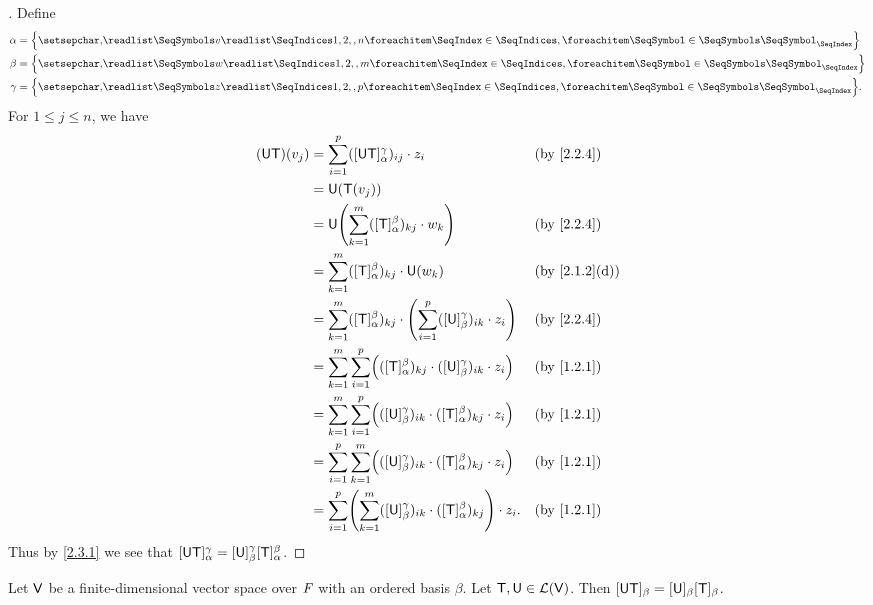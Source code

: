 \begin{proof}[]
  Define
  \begin{align*}
    \alpha & = \set{\seq{v}{1,2,,n}}  \\
    \beta  & = \set{\seq{w}{1,2,,m}}  \\
    \gamma & = \set{\seq{z}{1,2,,p}}.
  \end{align*}
  For \(1 \leq j \leq n\), we have
  \begin{align*}
    (\U \T)(v_j) & = \sum_{i = 1}^p ([\U \T]_{\alpha}^{\gamma})_{i j} \cdot z_i                                                      &  & \text{(by \cref{2.2.4})}    \\
                 & = \U(\T(v_j))                                                                                                                                      \\
                 & = \U\pa{\sum_{k = 1}^m ([\T]_{\alpha}^{\beta})_{k j} \cdot w_k}                                                   &  & \text{(by \cref{2.2.4})}    \\
                 & = \sum_{k = 1}^m ([\T]_{\alpha}^{\beta})_{k j} \cdot \U(w_k)                                                      &  & \text{(by \cref{2.1.2}(d))} \\
                 & = \sum_{k = 1}^m ([\T]_{\alpha}^{\beta})_{k j} \cdot \pa{\sum_{i = 1}^p ([\U]_{\beta}^{\gamma})_{i k} \cdot z_i}  &  & \text{(by \cref{2.2.4})}    \\
                 & = \sum_{k = 1}^m \sum_{i = 1}^p \pa{([\T]_{\alpha}^{\beta})_{k j}  \cdot ([\U]_{\beta}^{\gamma})_{i k} \cdot z_i} &  & \text{(by \cref{1.2.1})}    \\
                 & = \sum_{k = 1}^m \sum_{i = 1}^p \pa{([\U]_{\beta}^{\gamma})_{i k} \cdot ([\T]_{\alpha}^{\beta})_{k j} \cdot z_i}  &  & \text{(by \cref{1.2.1})}    \\
                 & = \sum_{i = 1}^p \sum_{k = 1}^m \pa{([\U]_{\beta}^{\gamma})_{i k} \cdot ([\T]_{\alpha}^{\beta})_{k j} \cdot z_i}  &  & \text{(by \cref{1.2.1})}    \\
                 & = \sum_{i = 1}^p \pa{\sum_{k = 1}^m ([\U]_{\beta}^{\gamma})_{i k} \cdot ([\T]_{\alpha}^{\beta})_{k j}} \cdot z_i. &  & \text{(by \cref{1.2.1})}
  \end{align*}
  Thus by \cref{2.3.1} we see that \([\mathsf{U} \mathsf{T}]_{\alpha}^{\gamma} = [\mathsf{U}]_{\beta}^{\gamma} [\mathsf{T}]_{\alpha}^{\beta}\).
\end{proof}

\begin{cor}\label{2.3.3}
  Let \(\mathsf{V}\) be a finite-dimensional vector space over \(\mathit{F}\) with an ordered basis \(\beta\).
  Let \(\mathsf{T}, \mathsf{U} \in \mathcal{L}(\mathsf{V})\).
  Then \([\mathsf{U} \mathsf{T}]_{\beta} = [\mathsf{U}]_{\beta} [\mathsf{T}]_{\beta}\).
\end{cor}

